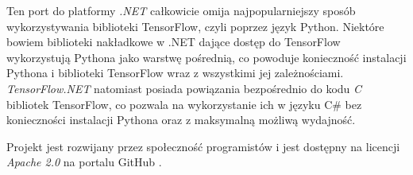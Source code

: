 Ten port do platformy \emph{.NET} całkowicie omija najpopularniejszy sposób wykorzystywania biblioteki TensorFlow, czyli poprzez język Python.
Niektóre bowiem biblioteki nakładkowe w .NET dające dostęp do TensorFlow wykorzystują Pythona jako warstwę pośrednią, co powoduje konieczność instalacji Pythona i biblioteki TensorFlow wraz z wszystkimi jej zależnościami.
\emph{TensorFlow.NET} natomiast posiada powiązania bezpośrednio do kodu \emph{C} bibliotek TensorFlow, co pozwala na wykorzystanie ich w języku C\# bez konieczności instalacji Pythona oraz z maksymalną możliwą wydajność.

Projekt jest rozwijany przez społeczność programistów i jest dostępny na licencji \emph{Apache 2.0} na portalu GitHub \cite{scisharp-tensorflownet-repo}.
